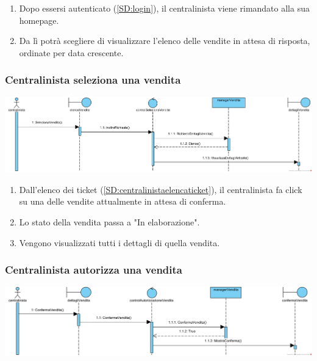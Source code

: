 \documentclass[12pt,a4paper]{article}
\begin{document}
\begin{enumerate}
\item Dopo essersi autenticato (\ref{SD:login}), il centralinista viene rimandato alla sua homepage. 
\item Da lì potrà scegliere di visualizzare l'elenco delle vendite in attesa di risposta, ordinate per data crescente.
\end{enumerate}

\subsubsection{Centralinista seleziona una vendita}
\label{SD:selezionevenditacentralinista}

\begin{center}
\includegraphics[width=\textwidth]{SequenceDiagram/CentralinistaVenditaSeleziona}
\end{center}

\begin{enumerate}
\item Dall'elenco dei ticket (\ref{SD:centralinistaelencaticket}), il centralinista fa click su una delle vendite attualmente in attesa di conferma.
\item Lo stato della vendita passa a "In elaborazione".
\item Vengono visualizzati tutti i dettagli di quella vendita.
\end{enumerate}

\subsubsection{Centralinista autorizza una vendita}
\label{SD:centralinistaautorizza}
\begin{center}
\includegraphics[width=\textwidth]{SequenceDiagram/CentralinistaVenditaAutorizza}
\end{center}
\end{document}
